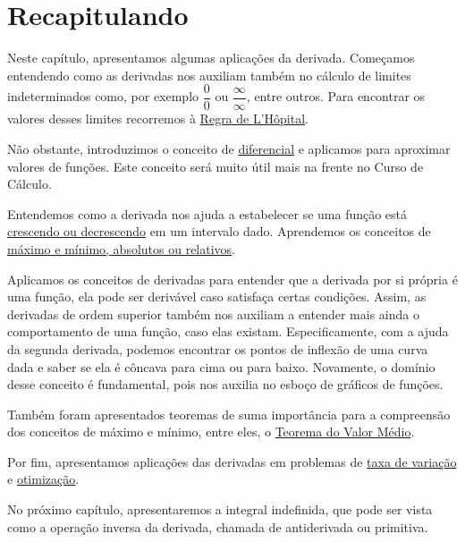 \cleardoublepage\documentclass[../main.tex]{subfiles}
\begin{document}
\section{Recapitulando}
Neste capítulo, apresentamos algumas aplicações da derivada. Começamos entendendo como  as derivadas nos auxiliam também no cálculo de limites indeterminados como, por exemplo \(\dfrac{0}{0}\) ou \(\dfrac{\infty}{\infty}\), entre outros. Para encontrar os valores desses limites recorremos à \hyperlink{Lopital}{Regra de L’Hôpital}.

Não obstante, introduzimos o conceito de \hyperlink{Diff}{diferencial} e aplicamos para aproximar valores de funções. Este conceito será muito útil mais na frente no Curso de Cálculo.

Entendemos como a derivada nos ajuda a estabelecer se uma função está \hyperlink{unc-CrescDecresc}{crescendo ou decrescendo} em um intervalo dado. Aprendemos os conceitos de \hyperlink{MaxMin}{máximo e mínimo, absolutos ou relativos}.

Aplicamos os conceitos de derivadas para entender  que a derivada por si própria é uma função, ela pode ser derivável caso satisfaça certas condições. Assim, as derivadas de ordem superior também nos auxiliam a entender mais ainda o comportamento de uma função, caso elas existam. Especificamente, com a ajuda da segunda derivada, podemos encontrar os pontos de inflexão de uma curva dada e saber se ela é côncava para cima ou para baixo. Novamente, o domínio desse conceito é fundamental, pois nos auxilia no esboço de gráficos de funções.

Também foram apresentados teoremas de suma importância para a compreensão dos conceitos de máximo e mínimo, entre eles, o \hyperlink{TeoValorMedio}{Teorema do Valor Médio}.

Por fim, apresentamos aplicações das derivadas em problemas de \hyperlink{TaxaVar}{taxa de variação} e \hyperlink{Otimiza}{otimização}.

No próximo capítulo, apresentaremos a integral indefinida, que pode ser vista como a operação inversa da derivada, chamada de antiderivada ou primitiva.

 
\end{document}
